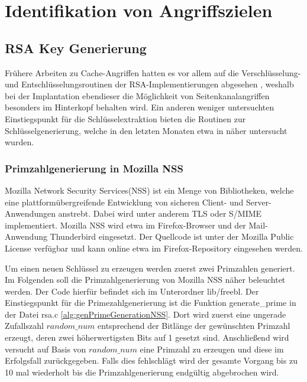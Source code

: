 \chapter{Identifikation von Angriffszielen}
\label{chapter:results}

\section{RSA Key Generierung}

Frühere Arbeiten zu Cache-Angriffen hatten es vor allem auf die Verschlüsselung- und Entschlüsselungsroutinen der RSA-Implementierungen abgesehen \cite{FlushReload, CacheBleedOpenSSLRSA}, weshalb bei der Implantation ebendieser die Möglichkeit von Seitenkanalangriffen besonders im Hinterkopf behalten wird.
Ein anderen weniger untersuchten Einstiegspunkt für die Schlüsselextraktion bieten die Routinen zur Schlüsselgenerierung, welche in den letzten Monaten etwa in \cite{RSAKeyGeneration2} näher untersucht wurden.

\subsection{Primzahlgenerierung in Mozilla NSS}

Mozilla Network Security Services(NSS) ist ein Menge von Bibliotheken, welche eine plattformübergreifende Entwicklung von sicheren Client- und Server-Anwendungen anstrebt. Dabei wird unter anderem TLS oder S/MIME implementiert. Mozilla NSS wird etwa im Firefox-Browser und der Mail-Anwendung Thunderbird eingesetzt.
Der Quellcode ist unter der Mozilla Public License verfügbar und kann online etwa im Firefox-Repository \cite{MozillaDXR} eingesehen werden.

Um einen neuen Schlüssel zu erzeugen werden zuerst zwei Primzahlen generiert. 
Im Folgenden soll die Primzahlgenerierung von Mozilla NSS näher beleuchtet werden.
Der Code hierfür befindet sich im Unterordner lib/freebl.
Der Einstiegspunkt für die Primezahlgenerierung ist die Funktion generate_prime in der Datei rsa.c \ref{alg:genPrimeGenerationNSS}.
Dort wird zuerst eine ungerade Zufallszahl $random\_num$ entsprechend der Bitlänge der gewünschten Primzahl erzeugt, deren zwei höherwertigsten Bits auf 1 gesetzt sind.
Anschließend wird versucht auf Basis von $random\_num$ eine Primzahl zu erzeugen und diese im Erfolgsfall zurückgegeben.
Falls dies fehlschlägt wird der gesamte Vorgang bis zu 10 mal wiederholt bis die Primzahlgenerierung endgültig abgebrochen wird.

